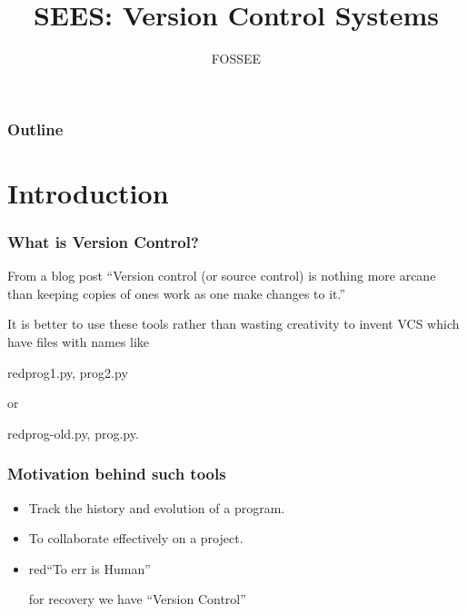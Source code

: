 \documentclass[14pt,compress]{beamer}
\title[Version Control Systems]{SEES: Version Control Systems}
\author[FOSSEE] {FOSSEE}
\institute[IIT Bombay] {Department of Aerospace Engineering\\IIT Bombay}
\date[]{}
\begin{document}
\begin{frame}
  \maketitle
\end{frame}

\begin{frame}
  \frametitle{Outline}
  \tableofcontents
\end{frame}


\section{Introduction}

\begin{frame}
  \frametitle{What is Version Control?}
  \begin{block}{From a blog post}
    ``Version control (or source control) is nothing more arcane than keeping copies of ones work as one make changes to it.''
  \end{block}
  \pause
  \begin{block}{}
    It is better to use these tools rather than wasting creativity to invent VCS which have files with names like \begin{color}{red}{prog1.py, prog2.py}\end{color} or \begin{color}{red}prog-old.py, prog.py.\end{color}
  \end{block}
\end{frame}

\begin{frame}
  \frametitle{Motivation behind such tools}
  \begin{itemize}
  \item Track the history and evolution of a program.
  \item To collaborate effectively on a project.
  \item \begin{color}{red}``To err is Human''\end{color} \pause for recovery we have ``Version Control''
  \end{itemize}
\end{frame}
\end{document}
